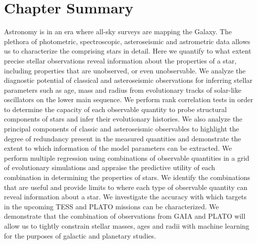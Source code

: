 


\section*{Chapter Summary}
Astronomy is in an era where all-sky surveys are mapping the Galaxy. 
The plethora of photometric, spectroscopic, asteroseismic and astrometric data allows us to characterize the comprising stars in detail.  
Here we quantify to what extent precise stellar observations reveal information about the properties of a star, including properties that are unobserved, or even unobservable. 
We analyze the diagnostic potential of classical and asteroseismic observations for inferring stellar parameters such as age, mass and radius from evolutionary tracks of solar-like oscillators on the lower main sequence. 
We perform rank correlation tests in order to determine the capacity of each observable quantity to probe structural components of stars and infer their evolutionary histories. We also analyze the principal components of classic and asteroseismic observables to highlight the degree of redundancy present in the measured quantities and demonstrate the extent to which information of the model parameters can be extracted.
We perform multiple regression using combinations of observable quantities in a grid of evolutionary simulations and appraise the predictive utility of each combination in determining the properties of stars.
We identify the combinations that are useful and provide limits to where each type of observable quantity can reveal information about a star. We investigate the accuracy with which targets in the upcoming TESS and PLATO missions can be characterized.  We demonstrate that the combination of observations from GAIA and PLATO will allow us to tightly constrain stellar masses, ages and radii with machine learning for the purposes of galactic and planetary studies.

